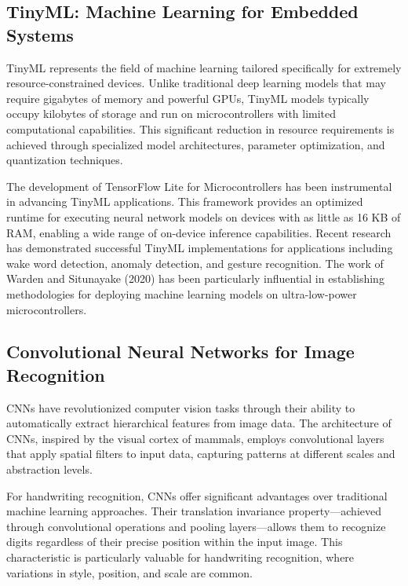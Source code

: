 \documentclass[
  9pt,
  letterpaper,
  abstract,
  titlepage]{scrbook}
\begin{document}
\subsection{TinyML: Machine Learning for Embedded
Systems}\label{tinyml-machine-learning-for-embedded-systems}

TinyML represents the field of machine learning tailored specifically
for extremely resource-constrained devices. Unlike traditional deep
learning models that may require gigabytes of memory and powerful GPUs,
TinyML models typically occupy kilobytes of storage and run on
microcontrollers with limited computational capabilities. This
significant reduction in resource requirements is achieved through
specialized model architectures, parameter optimization, and
quantization techniques.

The development of TensorFlow Lite for Microcontrollers has been
instrumental in advancing TinyML applications. This framework provides
an optimized runtime for executing neural network models on devices with
as little as 16 KB of RAM, enabling a wide range of on-device inference
capabilities. Recent research has demonstrated successful TinyML
implementations for applications including wake word detection, anomaly
detection, and gesture recognition. The work of Warden and Situnayake
(2020) has been particularly influential in establishing methodologies
for deploying machine learning models on ultra-low-power
microcontrollers.

\subsection{Convolutional Neural Networks for Image
Recognition}\label{convolutional-neural-networks-for-image-recognition}

CNNs have revolutionized computer vision tasks through their ability to
automatically extract hierarchical features from image data. The
architecture of CNNs, inspired by the visual cortex of mammals, employs
convolutional layers that apply spatial filters to input data, capturing
patterns at different scales and abstraction levels.

For handwriting recognition, CNNs offer significant advantages over
traditional machine learning approaches. Their translation invariance
property---achieved through convolutional operations and pooling
layers---allows them to recognize digits regardless of their precise
position within the input image. This characteristic is particularly
valuable for handwriting recognition, where variations in style,
position, and scale are common.
\end{document}

